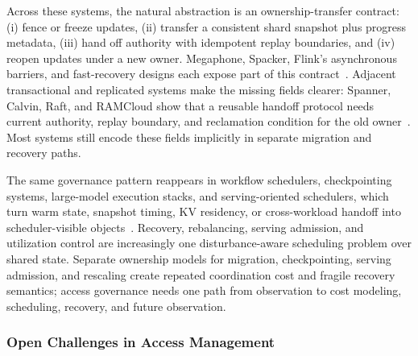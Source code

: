 ﻿\documentclass[manuscript]{acmart}
\begin{document}
Across these systems, the natural abstraction is an ownership-transfer contract: (i) fence or freeze updates, (ii) transfer a consistent shard snapshot plus progress metadata, (iii) hand off authority with idempotent replay boundaries, and (iv) reopen updates under a new owner. Megaphone, Spacker, Flink's asynchronous barriers, and fast-recovery designs each expose part of this contract~\cite{nasir2019megaphone,mao2025spacker,carbone2015asynchronous,zhao2024recovery}. Adjacent transactional and replicated systems make the missing fields clearer: Spanner, Calvin, Raft, and RAMCloud show that a reusable handoff protocol needs current authority, replay boundary, and reclamation condition for the old owner~\cite{corbett2012spanner,thomson2012calvin,ongaro2014raft,ousterhout2011ramcloud}. Most systems still encode these fields implicitly in separate migration and recovery paths.

The same governance pattern reappears in workflow schedulers, checkpointing systems, large-model execution stacks, and serving-oriented schedulers, which turn warm state, snapshot timing, KV residency, or cross-workload handoff into scheduler-visible objects~\cite{mahgoub2021sonic,mahgoub2022orion,zhao2025rtsfaas,wan2025bytecheckpoint,huang2025flowcheck,lian2025universal,lin2025weipipe,liu2025mario,hong2025sola,oh2024exegpt,wang2025sirius}. Recovery, rebalancing, serving admission, and utilization control are increasingly one disturbance-aware scheduling problem over shared state. Separate ownership models for migration, checkpointing, serving admission, and rescaling create repeated coordination cost and fragile recovery semantics; access governance needs one path from observation to cost modeling, scheduling, recovery, and future observation.



\subsubsection{Open Challenges in Access Management}
\end{document}
